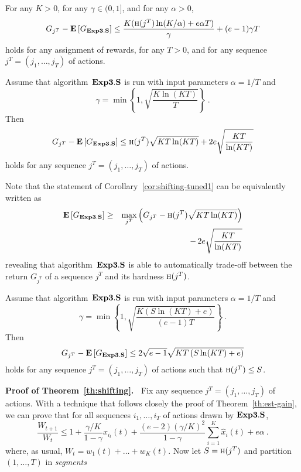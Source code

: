\documentclass[12pt]{article}
\newcommand{\E}{\mbox{\rm\bf E}}
\newcommand{\Aests}{{\bf Exp3.S}}
\newcommand{\braces}[1]{\left\{{#1}\right\}}
\newcommand{\compl}{\mbox{\sc h}}
\newcommand{\x}[2]{x_{#1}({#2})}
\newcommand{\w}[2]{w_{#1}({#2})}
\renewcommand{\i}[1]{i_{#1}}
\newcommand{\xit}{\x{\i{t}}{t}}
\newcommand{\hx}[2]{\hat{x}_{#1}(#2)}
\begin{document}
%
\begin{theorem}
\label{th:shifting}
For any $K > 0$, for any $\gamma\in(0,1]$, and for any $\alpha > 0$,
\[
    G_{j^T} - \E\left[G_{\Aests}\right]
\leq
    \frac{K(\compl(j^T)\ln(K/\alpha)+e\alpha T)}{\gamma} + (e-1)\gamma T
\]
holds for any assignment of rewards, for any $T > 0$, and for any sequence
$j^T=(j_1,\ldots,j_T)$ of actions.
\end{theorem}
%
\begin{cor}
\label{cor:shifting-tuned1}
Assume that algorithm~$\Aests$ is run with input parameters
$\alpha=1/T$ and
\[
        \gamma = \min\braces{1,\sqrt{\frac{K\ln(KT)}{T}}}~.
\]
Then
\[
        G_{j^T} - \E\left[G_{\Aests}\right]
\leq
        \compl(j^T)\sqrt{KT\ln(KT)} + 2e\sqrt{\frac{KT}{\ln(KT)}}
\]
holds for any sequence $j^T=(j_1,\ldots,j_T)$ of actions.
\end{cor}
Note that the statement of Corollary~\ref{cor:shifting-tuned1}
can be equivalently written as
\begin{eqnarray*}
        \E\left[G_{\Aests}\right]
& \geq &
        \max_{j^T} \left( G_{j^T} - 
        \compl(j^T)\sqrt{KT\ln(KT)} \right)
\\ &&
        -\, 2e\sqrt{\frac{KT}{\ln(KT)}}
\end{eqnarray*}
revealing that algorithm~$\Aests$ is able to automatically trade-off between
the return $G_{j^T}$ of a sequence $j^T$ and its hardness $\compl(j^T)$.
\begin{cor}
\label{cor:shifting-tuned2}
Assume that algorithm~$\Aests$ is run with input parameters
$\alpha=1/T$ and
\[
        \gamma = \min\braces{1,\sqrt{\frac{K(S\ln(KT)+e)}{(e-1)T}}}~.
\]
Then
\[
        G_{j^T} - \E\left[G_{\Aests}\right]
\leq
        2\sqrt{e-1} \sqrt{KT\left(S\ln(KT)+e\right)}
\]
holds for any sequence $j^T=(j_1,\ldots,j_T)$ of actions such that $\compl(j^T) \leq S$.
\end{cor}
%
{\bf Proof of Theorem~\ref{th:shifting}.\ }
Fix any sequence $j^T=(j_1,\ldots,j_T)$ of actions.
With a technique that follows closely the proof of Theorem~\ref{th:est-gain},
we can prove that for all sequences $i_1,\ldots,i_T$ of actions drawn by $\Aests$,
\begin{equation}
\label{eq:shift-basic}
        \frac{W_{t+1}}{W_t} 
\leq
        1 + \frac{\gamma/K}{1-\gamma} \xit
    + \frac{(e-2)(\gamma/K)^2}{1-\gamma}\sum_{i=1}^K \hx{i}{t} + e\alpha~.
\end{equation}
where, as usual, $W_t=\w{1}{t}+\ldots+\w{K}{t}$.
Now let $S=\compl(j^T)$ and partition $(1,\ldots,T)$ in {\em segments}
\end{document}
